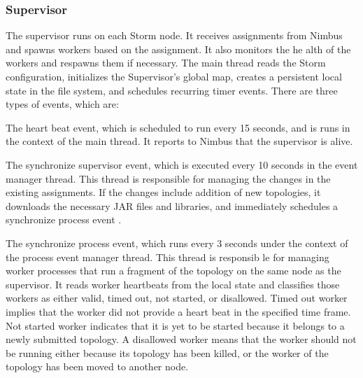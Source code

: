 \documentclass[9pt,twocolumn,twoside]{../../styles/osajnl}
\begin{document}
\subsubsection{Supervisor}
The supervisor runs on each Storm node. It receives assignments from
Nimbus and spawns workers based on the assignment. It also monitors
the he alth of the workers and respawns them if necessary. The main
thread reads the Storm configuration, initializes the Supervisor’s
global map, creates a persistent local state in the file system, and
schedules recurring timer events. There are three types of events,
which are:

\begin{description}
\item The heart beat event, which is scheduled to run every 15
  seconds, and is runs in the context of the main thread. It reports
  to Nimbus that the supervisor is alive.
\item The synchronize supervisor event, which is executed every 10
  seconds in the event manager thread. This thread is responsible for
  managing the changes in the existing assignments. If the changes
  include addition of new topologies, it downloads the necessary JAR
  files and libraries, and immediately schedules a synchronize process
  event .
\item The synchronize process event, which runs every 3 seconds under
  the context of the process event manager thread. This thread is
  responsib le for managing worker processes that run a fragment of
  the topology on the same node as the supervisor. It reads worker
  heartbeats from the local state and classifies those workers as
  either valid, timed out, not started, or disallowed. Timed out
  worker implies that the worker did not provide a heart beat in the
  specified time frame. Not started worker indicates that it is yet to
  be started because it belongs to a newly submitted topology. A
  disallowed worker means that the worker should not be running either
  because its topology has been killed, or the worker of the topology
  has been moved to another node.
\end{description}
\end{document}
